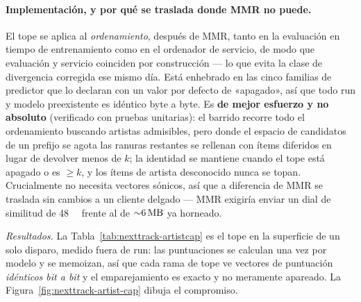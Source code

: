 \documentclass[11pt]{article}
\begin{document}
\paragraph{Implementación, y por qué se traslada donde MMR no puede.} El tope se
aplica al \emph{ordenamiento}, después de MMR, tanto en la evaluación en tiempo de
entrenamiento como en el ordenador de servicio, de modo que evaluación y servicio
coinciden por construcción --- lo que evita la clase de divergencia corregida ese
mismo día. Está enhebrado en las cinco familias de predictor que lo declaran con un
valor por defecto de «apagado», así que todo run y modelo preexistente es idéntico
byte a byte. Es \textbf{de mejor esfuerzo y no absoluto} (verificado con pruebas
unitarias): el barrido recorre todo el ordenamiento buscando artistas admisibles,
pero donde el espacio de candidatos de un prefijo se agota las ranuras restantes se
rellenan con ítems diferidos en lugar de devolver menos de $k$; la identidad se
mantiene cuando el tope está apagado o es $\ge k$, y los ítems de artista desconocido
nunca se topan. Crucialmente no necesita vectores sónicos, así que a diferencia de
MMR se traslada sin cambios a un cliente delgado --- MMR exigiría enviar un dial de
similitud de \SI{48}{\mega\byte} frente al de ${\sim}\SI{6}{\mega\byte}$ ya
horneado.

\emph{Resultados.} La Tabla~\ref{tab:nexttrack-artistcap} es el tope en la
superficie de un solo disparo, medido fuera de run: las puntuaciones se calculan una
vez por modelo y se memoizan, así que cada rama de tope ve vectores de puntuación
\emph{idénticos bit a bit} y el emparejamiento es exacto y no meramente apareado. La
Figura~\ref{fig:nexttrack-artist-cap} dibuja el compromiso.
\end{document}

